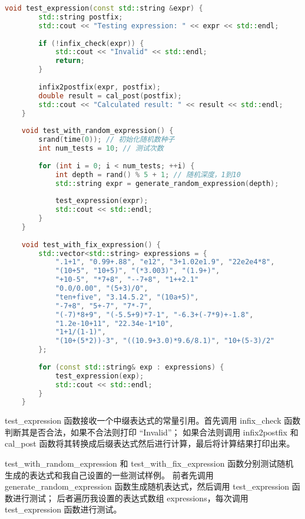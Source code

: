 \documentclass[UTF8]{ctexart}
\begin{document}
\begin{lstlisting}[language=c++, breaklines=true, frame=shadowbox, rulesepcolor=\color{red!20!green!20!blue!20}]
    void test_expression(const std::string &expr) {
        std::string postfix;
        std::cout << "Testing expression: " << expr << std::endl;
    
        if (!infix_check(expr)) {
            std::cout << "Invalid" << std::endl;
            return;
        }
    
        infix2postfix(expr, postfix);
        double result = cal_post(postfix);
        std::cout << "Calculated result: " << result << std::endl;
    }
    
    void test_with_random_expression() {
        srand(time(0)); // 初始化随机数种子
        int num_tests = 10; // 测试次数
    
        for (int i = 0; i < num_tests; ++i) {
            int depth = rand() % 5 + 1; // 随机深度，1到10
            std::string expr = generate_random_expression(depth);
    
            test_expression(expr);
            std::cout << std::endl;
        }
    }
    
    void test_with_fix_expression() {
        std::vector<std::string> expressions = {
            ".1+1", "0.99+.88", "e12", "3+1.02e1.9", "22e2e4*8", 
            "(10+5", "10+5)", "(*3.003)", "(1.9+)", 
            "+10-5", "*7+8", "--7+8", "1++2.1"
            "0.0/0.00", "(5+3)/0", 
            "ten+five", "3.14.5.2", "(10a+5)", 
            "-7+8", "5+-7", "7*-7", 
            "(-7)*8+9", "(-5.5+9)*7-1", "-6.3+(-7*9)+-1.8", 
            "1.2e-10+11", "22.34e-1*10", 
            "1+1/(1-1)", 
            "(10+(5*2))-3", "((10.9+3.0)*9.6/8.1)", "10+(5-3)/2"
        };
    
        for (const std::string& exp : expressions) {
            test_expression(exp);
            std::cout << std::endl;
        }
    }
\end{lstlisting}

test\_expression 函数接收一个中缀表达式的常量引用。首先调用 infix\_check 函数判断其是否合法，如果不合法则打印 “Invalid”；
如果合法则调用 infix2postfix 和 cal\_post 函数将其转换成后缀表达式然后进行计算，最后将计算结果打印出来。

test\_with\_random\_expression 和 test\_with\_fix\_expression 函数分别测试随机生成的表达式和我自己设置的一些测试样例。
前者先调用 generate\_random\_expression 函数生成随机表达式，然后调用 test\_expression 函数进行测试；
后者遍历我设置的表达式数组 expressions，每次调用 test\_expression 函数进行测试。
\end{document}
